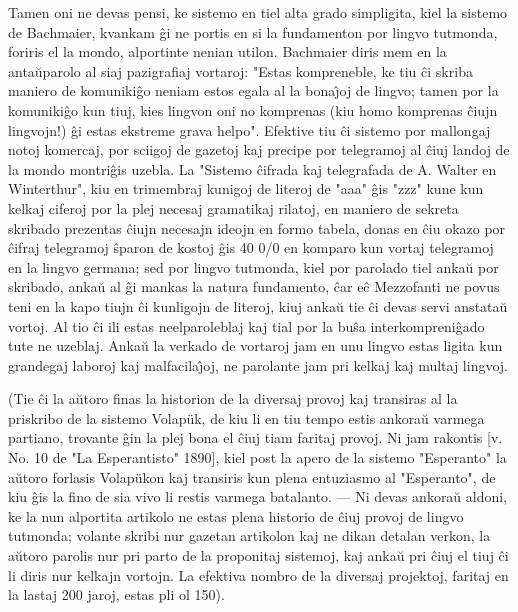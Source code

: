    Tamen oni ne devas pensi, ke sistemo en tiel alta grado simpligita,
kiel la sistemo de Bachmaier, kvankam \^gi ne portis en si la
fundamenton por lingvo tutmonda, foriris el la mondo, alportinte
nenian utilon. Bachmaier diris mem en la anta\u uparolo al siaj
pazigrafiaj vortaroj: "Estas kompreneble, ke tiu \^ci skriba
maniero de komuniki\^go neniam estos egala al la bona\^{\j}oj de
lingvo; tamen por la komuniki\^go kun tiuj, kies lingvon oni no
komprenas (kiu homo komprenas \^ciujn lingvojn!) \^gi estas ekstreme
grava helpo". Efektive tiu \^ci sistemo por mallongaj notoj
komercaj, por sciigoj de gazetoj kaj precipe por telegramoj al
\^ciuj landoj de la mondo montri\^gis uzebla. La "Sistemo \^cifrada
kaj telegrafada de A. Walter en Winterthur", kiu en trimembraj
kunigoj de literoj de "aaa" \^gis "zzz" kune kun kelkaj ciferoj
por la plej necesaj gramatikaj rilatoj, en maniero de sekreta
skribado prezentas \^ciujn necesajn ideojn en formo tabela, donas en
\^ciu okazo por \^cifraj telegramoj \^sparon de kostoj \^gis 40 0/0
en komparo kun vortaj telegramoj en la lingvo germana; sed por
lingvo tutmonda, kiel por parolado tiel anka\u u por skribado,
anka\u u al \^gi mankas la natura fundamento, \^car e\^c Mezzofanti
ne povus teni en la kapo tiujn \^ci kunligojn de literoj, kiuj
anka\u u tie \^ci devas servi anstata\u u vortoj. Al tio \^ci ili
estas neelparoleblaj kaj tial por la bu\^sa interkompreni\^gado tute
ne uzeblaj. Anka\u u la verkado de vortaroj jam en unu lingvo estas
ligita kun grandegaj laboroj kaj malfacila\^{\j}oj, ne parolante jam
pri kelkaj kaj multaj lingvoj.

   (Tie \^ci la a\u utoro finas la historion de la diversaj provoj kaj
transiras al la priskribo de la sistemo Volap\"uk, de kiu li en tiu
tempo estis ankora\u u varmega partiano, trovante \^gin la plej bona
el \^ciuj tiam faritaj provoj. Ni jam rakontis [v. No. 10 de "La
Esperantisto" 1890], kiel post la apero de la sistemo "Esperanto"
la a\u utoro forlasis Volap\"ukon kaj transiris kun plena entuziasmo
al "Esperanto", de kiu \^gis la fino de sia vivo li restis varmega
batalanto. --- Ni devas ankora\u u aldoni, ke la nun alportita
artikolo ne estas plena historio de \^ciuj provoj de lingvo
tutmonda; volante skribi nur gazetan artikolon kaj ne dikan detalan
verkon, la a\u utoro parolis nur pri parto de la proponitaj
sistemoj, kaj anka\u u pri \^ciuj el tiuj \^ci li diris nur kelkajn
vortojn. La efektiva nombro de la diversaj projektoj, faritaj en la
lastaj 200 jaroj, estas pli ol 150).

\smallrule{}
